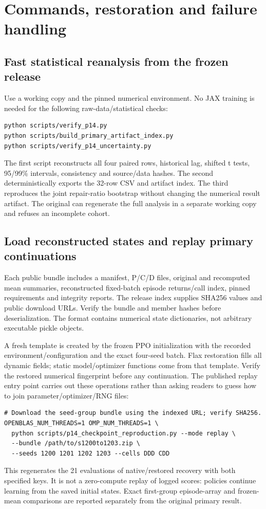\section{Commands, restoration and failure handling}\label{app:commands}
\subsection{Fast statistical reanalysis from the frozen release}
Use a working copy and the pinned numerical environment. No JAX training is needed for the following raw-data/statistical checks:
\begin{verbatim}
python scripts/verify_p14.py
python scripts/build_primary_artifact_index.py
python scripts/verify_p14_uncertainty.py
\end{verbatim}
The first script reconstructs all four paired rows, historical lag, shifted t tests, 95/99\% intervals, consistency and source/data hashes. The second deterministically exports the 32-row CSV and artifact index. The third reproduces the joint repair-ratio bootstrap without changing the numerical result artifact. The original  can regenerate the full analysis in a separate working copy and refuses an incomplete cohort.

\subsection{Load reconstructed states and replay primary continuations}
Each public bundle includes a manifest, P/C/D  files, original and recomputed mean summaries, reconstructed fixed-batch episode returns/call index, pinned requirements and integrity reports. The release index supplies SHA256 values and public download URLs. Verify the bundle and member hashes before deserialization. The format contains numerical state dictionaries, not arbitrary executable pickle objects.

A fresh template is created by the frozen PPO initialization with the recorded environment/configuration and the exact four-seed batch. Flax restoration fills all dynamic fields; static model/optimizer functions come from that template. Verify the restored numerical fingerprint before any continuation. The published replay entry point carries out these operations rather than asking readers to guess how to join parameter/optimizer/RNG files:
\begin{verbatim}
# Download the seed-group bundle using the indexed URL; verify SHA256.
OPENBLAS_NUM_THREADS=1 OMP_NUM_THREADS=1 \
  python scripts/p14_checkpoint_reproduction.py --mode replay \
  --bundle /path/to/s1200to1203.zip \
  --seeds 1200 1201 1202 1203 --cells DDD CDD
\end{verbatim}
This regenerates the 21 evaluations of native/restored recovery with both specified keys. It is not a zero-compute replay of logged scores: policies continue learning from the saved initial states. Exact first-group episode-array and frozen-mean comparisons are reported separately from the original primary result.

